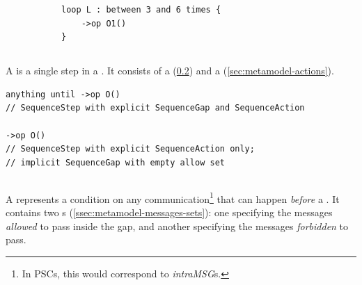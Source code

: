 \begin{figure}[h!]
\begin{subfigure}[t]{\egtextwidth}
\begin{lstlisting}[style=Example]
loop L : between 3 and 6 times {
    ->op O1()
}
\end{lstlisting}
\end{subfigure}
\hfill
\begin{subfigure}[t]{\eggraphicalwidth}
  \gsecaption
  \centering
\end{subfigure}
\end{figure}

\subsection{\mactionstep}\label{ssec:metamodel-steps-action}

A \mactionstep{} is a single step in a \msubsequence.  It consists of a
\msequencegap{} (\cref{ssec:metamodel-steps-gaps}) and a
\msequenceaction{} (\cref{sec:metamodel-actions}).

\begin{lstlisting}[style=Example]
anything until ->op O()
// SequenceStep with explicit SequenceGap and SequenceAction

->op O()
// SequenceStep with explicit SequenceAction only;
// implicit SequenceGap with empty allow set
\end{lstlisting}

\subsection{\msequencegap}\label{ssec:metamodel-steps-gaps}

A \msequencegap{} represents a condition on any
communication\footnote{In PSCs, this would correspond to
  \emph{intraMSG}s.} that can happen \emph{before} a \msequenceaction.
It contains two \mmessageset s (\cref{ssec:metamodel-messages-sets}):
one specifying the messages \emph{allowed} to pass inside the gap, and
another specifying the messages \emph{forbidden} to pass.

